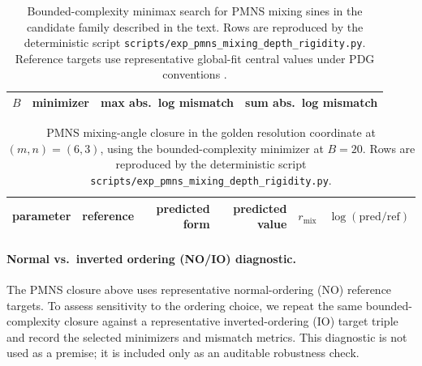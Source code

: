 \begin{table}[t]
\centering
\small
\setlength{\tabcolsep}{6pt}
\renewcommand{\arraystretch}{1.15}
\begin{tabular}{rllr}
\toprule
$B$ & minimizer & max abs.\ log mismatch & sum abs.\ log mismatch \\
\midrule
%
\end{tabular}
\caption{Bounded-complexity minimax search for PMNS mixing sines in the candidate family described in the text. Rows are reproduced by the deterministic script \texttt{scripts/exp\_pmns\_mixing\_depth\_rigidity.py}. Reference targets use representative global-fit central values under PDG conventions \cite{PDGRPP2024,Esteban2020NuFIT}.}
\label{tab:pmns_mixing_rigidity}
\end{table}

\begin{table}[t]
\centering
\small
\setlength{\tabcolsep}{6pt}
\renewcommand{\arraystretch}{1.15}
\begin{tabular}{lrrrrr}
\toprule
parameter & reference & predicted form & predicted value & $r_{\mathrm{mix}}$ & $\log(\mathrm{pred}/\mathrm{ref})$ \\
\midrule
%
\end{tabular}
\caption{PMNS mixing-angle closure in the golden resolution coordinate at $(m,n)=(6,3)$, using the bounded-complexity minimizer at $B=20$. Rows are reproduced by the deterministic script \texttt{scripts/exp\_pmns\_mixing\_depth\_rigidity.py}.}
\label{tab:pmns_mixing}
\end{table}

\paragraph{Normal vs.\ inverted ordering (NO/IO) diagnostic.}
The PMNS closure above uses representative normal-ordering (NO) reference targets.
To assess sensitivity to the ordering choice, we repeat the same bounded-complexity closure against a representative inverted-ordering (IO) target triple and record the selected minimizers and mismatch metrics.
This diagnostic is not used as a premise; it is included only as an auditable robustness check.

